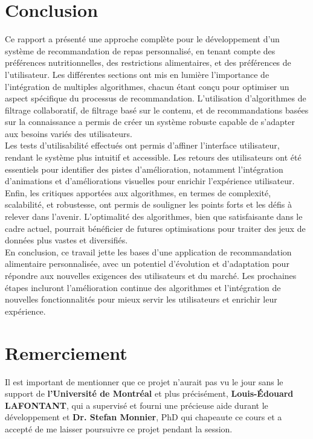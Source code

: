\documentclass[11pt]{article}
\begin{document}
\newpage
\section{Conclusion}
Ce rapport a présenté une approche complète pour le développement d'un système de recommandation de repas personnalisé, en tenant compte des préférences nutritionnelles, des restrictions alimentaires, et des préférences de l'utilisateur. Les différentes sections ont mis en lumière l'importance de l'intégration de multiples algorithmes, chacun étant conçu pour optimiser un aspect spécifique du processus de recommandation. L'utilisation d'algorithmes de filtrage collaboratif, de filtrage basé sur le contenu, et de recommandations basées sur la connaissance a permis de créer un système robuste capable de s'adapter aux besoins variés des utilisateurs.\\

Les tests d'utilisabilité effectués ont permis d'affiner l'interface utilisateur, rendant le système plus intuitif et accessible. Les retours des utilisateurs ont été essentiels pour identifier des pistes d'amélioration, notamment l'intégration d'animations et d'améliorations visuelles pour enrichir l'expérience utilisateur.\\

Enfin, les critiques apportées aux algorithmes, en termes de complexité, scalabilité, et robustesse, ont permis de souligner les points forts et les défis à relever dans l'avenir. L'optimalité des algorithmes, bien que satisfaisante dans le cadre actuel, pourrait bénéficier de futures optimisations pour traiter des jeux de données plus vastes et diversifiés.\\

En conclusion, ce travail jette les bases d'une application de recommandation alimentaire personnalisée, avec un potentiel d'évolution et d'adaptation pour répondre aux nouvelles exigences des utilisateurs et du marché. Les prochaines étapes incluront l'amélioration continue des algorithmes et l'intégration de nouvelles fonctionnalités pour mieux servir les utilisateurs et enrichir leur expérience.

\section{Remerciement}
Il est important de mentionner que ce projet n’aurait pas vu le jour sans le support de \textbf{l’Université de 
Montréal} et plus précisément, \textbf{Louis-Édouard LAFONTANT}, qui a supervisé et fourni une 
précieuse aide durant le développement et \textbf{Dr. Stefan Monnier}, PhD qui chapeaute ce cours et a accepté de me 
laisser poursuivre ce projet pendant la session.
\end{document}
